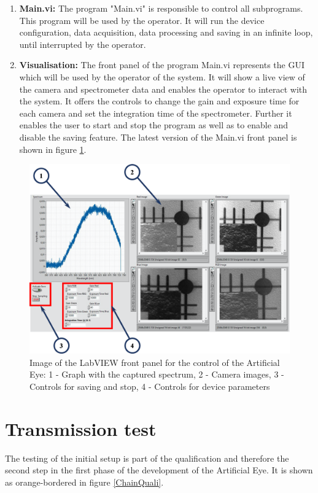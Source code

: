 \begin{enumerate}
	\item \textbf{Main.vi:} The program "Main.vi" is responsible to control all subprograms. This program will be used by the operator. It will run the device configuration, data acquisition, data processing and saving in an infinite loop, until interrupted by the operator.
	\item \textbf{Visualisation:} The front panel of the program Main.vi represents the GUI which will be used by the operator of the system. It will show a live view of the camera and spectrometer data and enables the operator to interact with the system. It offers the controls to change the gain and exposure time for each camera and set the integration time of the spectrometer. Further it enables the user to start and stop the program as well as to enable and disable the saving feature. The latest version of the Main.vi front panel is shown in figure \ref{Frontpanel}.
\end{enumerate}

\begin{figure}
\begin{center}
\includegraphics[width=12cm]{Pictures/Frontpanel}
\caption[Image of the LabVIEW front panel for the control of the Artificial Eye]{Image of the LabVIEW front panel for the control of the Artificial Eye: 1 - Graph with the captured spectrum, 2 - Camera images, 3 - Controls for saving and stop, 4 - Controls for device parameters}
\label{Frontpanel}
\end{center}
\end{figure}




\section{Transmission test} 
The testing of the initial setup is part of the qualification and therefore the second step in the first phase of the development of the Artificial Eye. It is shown as orange-bordered in figure \ref{ChainQuali}.

